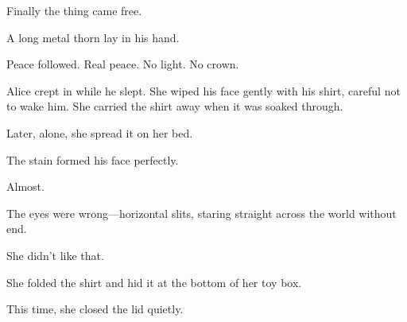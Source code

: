 Finally the thing came free.

A long metal thorn lay in his hand.

Peace followed. Real peace. No light. No crown.

Alice crept in while he slept. She wiped his face gently with his shirt, careful not to wake him. She carried the shirt away when it was soaked through.

Later, alone, she spread it on her bed.

The stain formed his face perfectly.

Almost.

The eyes were wrong—horizontal slits, staring straight across the world without end.

She didn’t like that.

She folded the shirt and hid it at the bottom of her toy box.

This time, she closed the lid quietly.

